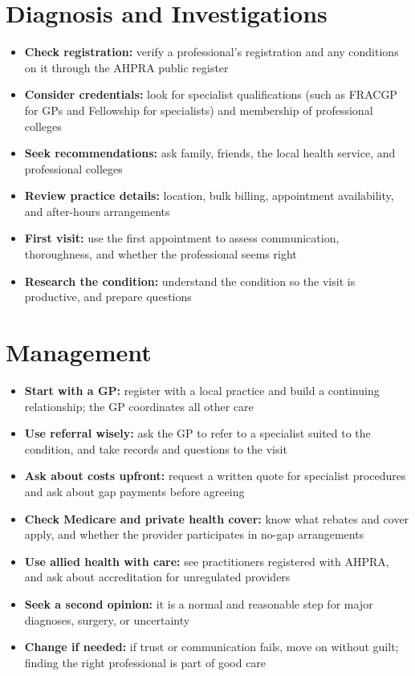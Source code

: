 \section*{Diagnosis and Investigations}
\begin{itemize}
    \item \textbf{Check registration:} verify a professional's registration and any conditions on it through the AHPRA public register
    \item \textbf{Consider credentials:} look for specialist qualifications (such as FRACGP for GPs and Fellowship for specialists) and membership of professional colleges
    \item \textbf{Seek recommendations:} ask family, friends, the local health service, and professional colleges
    \item \textbf{Review practice details:} location, bulk billing, appointment availability, and after-hours arrangements
    \item \textbf{First visit:} use the first appointment to assess communication, thoroughness, and whether the professional seems right
    \item \textbf{Research the condition:} understand the condition so the visit is productive, and prepare questions
\end{itemize}

\section*{Management}
\begin{itemize}
    \item \textbf{Start with a GP:} register with a local practice and build a continuing relationship; the GP coordinates all other care
    \item \textbf{Use referral wisely:} ask the GP to refer to a specialist suited to the condition, and take records and questions to the visit
    \item \textbf{Ask about costs upfront:} request a written quote for specialist procedures and ask about gap payments before agreeing
    \item \textbf{Check Medicare and private health cover:} know what rebates and cover apply, and whether the provider participates in no-gap arrangements
    \item \textbf{Use allied health with care:} see practitioners registered with AHPRA, and ask about accreditation for unregulated providers
    \item \textbf{Seek a second opinion:} it is a normal and reasonable step for major diagnoses, surgery, or uncertainty
    \item \textbf{Change if needed:} if trust or communication fails, move on without guilt; finding the right professional is part of good care
\end{itemize}

